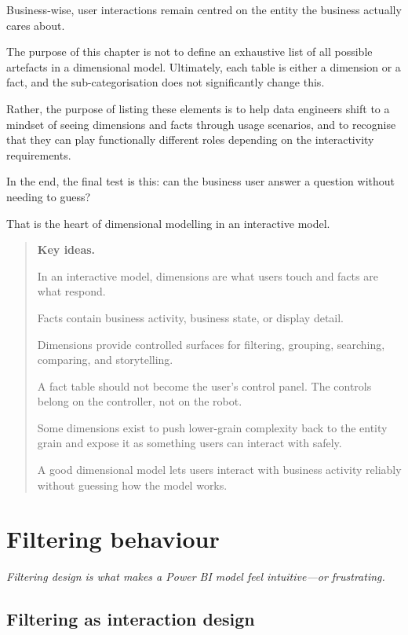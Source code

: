 \documentclass[10pt,openany,10pt]{book}
\begin{document}
Business-wise, user interactions remain centred on the entity the
business actually cares about.

The purpose of this chapter is not to define an exhaustive list of all
possible artefacts in a dimensional model. Ultimately, each table is
either a dimension or a fact, and the sub-categorisation does not
significantly change this.

Rather, the purpose of listing these elements is to help data engineers
shift to a mindset of seeing dimensions and facts through usage
scenarios, and to recognise that they can play functionally different
roles depending on the interactivity requirements.

In the end, the final test is this: can the business user answer a
question without needing to guess?

That is the heart of dimensional modelling in an interactive model.

\begin{quote}
\textbf{Key ideas.}

In an interactive model, dimensions are what users touch and facts are
what respond.

Facts contain business activity, business state, or display detail.

Dimensions provide controlled surfaces for filtering, grouping,
searching, comparing, and storytelling.

A fact table should not become the user's control panel. The controls
belong on the controller, not on the robot.

Some dimensions exist to push lower-grain complexity back to the entity
grain and expose it as something users can interact with safely.

A good dimensional model lets users interact with business activity
reliably without guessing how the model works.
\end{quote}

\newpage

\chapter{Filtering
behaviour}\label{docs-presenting-insights-filtering-behaviour}

\emph{Filtering design is what makes a Power BI model feel
intuitive---or frustrating.}

\section{Filtering as interaction
design}\label{filtering-as-interaction-design}
\end{document}
